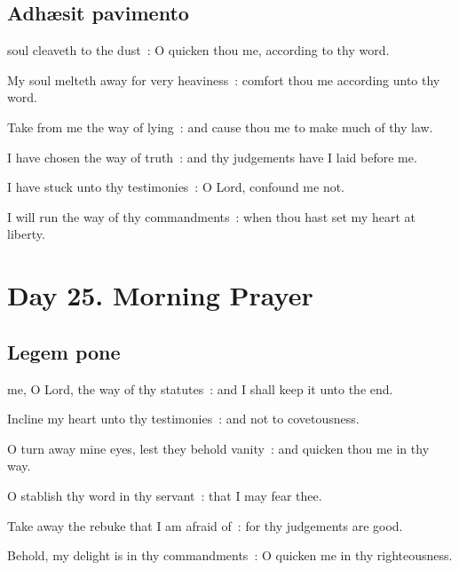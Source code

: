 \subsection{Adh{\ae}sit pavimento}
 soul cleaveth to the dust~: O quicken thou me, according to thy word.\par
{}
My soul melteth away for very heaviness~: comfort thou me according unto thy word.\par
{}Take from me the way of lying~: and cause thou me to make much of thy law.\par
{}I have chosen the way of truth~: and thy judgements have I laid before me.\par
{}I have stuck unto thy testimonies~: O Lord, confound me not.\par
{}I will run the way of thy commandments~: when thou hast set my heart at liberty.\par

\clearpage
\section*{Day 25. Morning Prayer}

\subsection{Legem pone}
 me, O Lord, the way of thy statutes~: and I shall keep it unto the end.\par
{}
Incline my heart unto thy testimonies~: and not to covetousness.\par
{}O turn away mine eyes, lest they behold vanity~: and quicken thou me in thy way.\par
{}O stablish thy word in thy servant~: that I may fear thee.\par
{}Take away the rebuke that I am afraid of~: for thy judgements are good.\par
{}Behold, my delight is in thy commandments~: O quicken me in thy righteousness.\par

